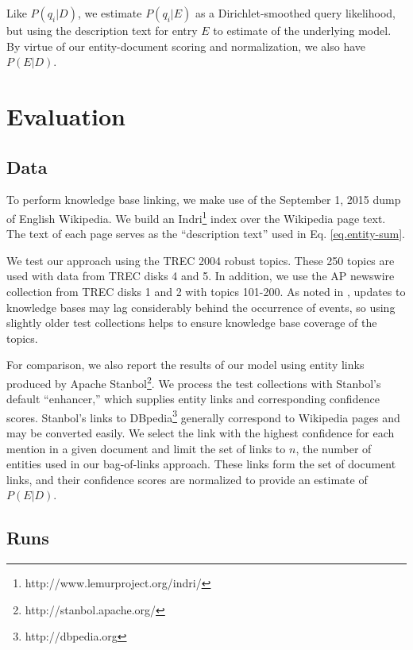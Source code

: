 \documentclass{sig-alternate}
\begin{document}
\noindent Like $P(q_i|D)$, we estimate $P(q_i|E)$ as a Dirichlet-smoothed query likelihood, but using the description text for entry $E$ to estimate of the underlying model. By virtue of our entity-document scoring and normalization, we also have $P(E|D)$.

\section{Evaluation}\label{section.evaluation}

\subsection{Data}\label{section.evaluation.collections}

To perform knowledge base linking, we make use of the September 1, 2015 dump of English Wikipedia. We build an Indri\footnote{http://www.lemurproject.org/indri/} index over the Wikipedia page text. The text of each page serves as the ``description text'' used in Eq. \ref{eq.entity-sum}.

We test our approach using the TREC 2004 robust topics. These 250 topics are used with data from TREC disks 4 and 5. In addition, we use the AP newswire collection from TREC disks 1 and 2 with topics 101-200. As noted in \cite{Frank2013}, updates to knowledge bases may lag considerably behind the occurrence of events, so using slightly older test collections helps to ensure knowledge base coverage of the topics.

For comparison, we also report the results of our model using entity links produced by Apache Stanbol\footnote{http://stanbol.apache.org/}. We process the test collections with Stanbol's default ``enhancer,'' which supplies entity links and corresponding confidence scores. Stanbol's links to DBpedia\footnote{http://dbpedia.org} generally correspond to Wikipedia pages and may be converted easily. We select the link with the highest confidence for each mention in a given document and limit the set of links to $n$, the number of entities used in our bag-of-links approach. These links form the set of document links, and their confidence scores are normalized to provide an estimate of $P(E|D)$.

\subsection{Runs}\label{section.evaluation.runs}

\end{document}
